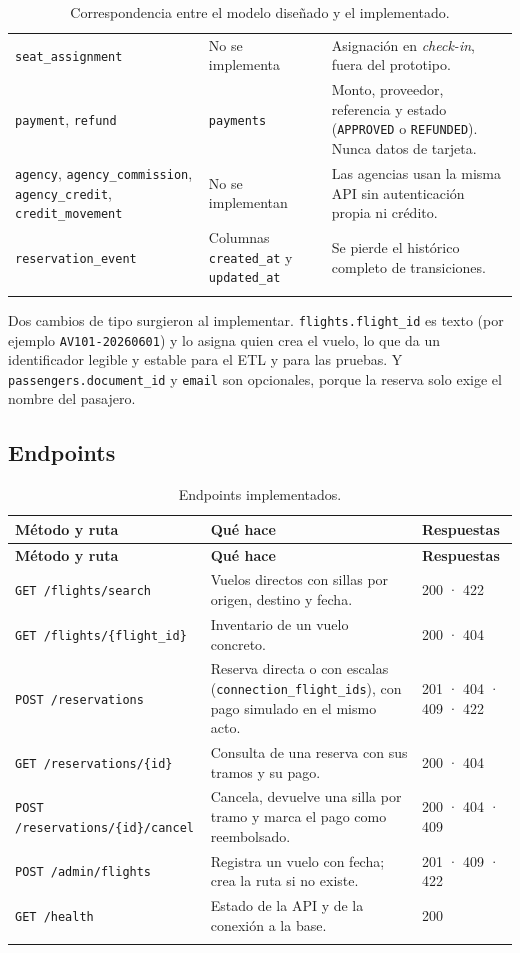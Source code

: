\begin{longtable}{@{}L{4.4cm} L{4.0cm} L{7.2cm}@{}}
\texttt{seat\_assignment} & No se implementa & Asignación en \emph{check-in}, fuera del prototipo. \\
\texttt{payment}, \texttt{refund} & \texttt{payments} & Monto, proveedor, referencia y estado (\texttt{APPROVED} o \texttt{REFUNDED}). Nunca datos de tarjeta. \\
\texttt{agency}, \texttt{agency\_commission}, \texttt{agency\_credit}, \texttt{credit\_movement} & No se implementan & Las agencias usan la misma API sin autenticación propia ni crédito. \\
\texttt{reservation\_event} & Columnas \texttt{created\_at} y \texttt{updated\_at} & Se pierde el histórico completo de transiciones. \\
\bottomrule
\caption{Correspondencia entre el modelo diseñado y el implementado.}
\end{longtable}

Dos cambios de tipo surgieron al implementar. \texttt{flights.flight\_id} es texto (por ejemplo \texttt{AV101-20260601}) y lo asigna quien crea el vuelo, lo que da un identificador legible y estable para el ETL y para las pruebas. Y \texttt{passengers.document\_id} y \texttt{email} son opcionales, porque la reserva solo exige el nombre del pasajero.

\subsection{Endpoints}
\begin{longtable}{@{}L{5.2cm} L{6.6cm} L{3.8cm}@{}}
\toprule \textbf{Método y ruta} & \textbf{Qué hace} & \textbf{Respuestas} \\ \midrule \endfirsthead
\toprule \textbf{Método y ruta} & \textbf{Qué hace} & \textbf{Respuestas} \\ \midrule \endhead
\texttt{GET /flights/search} & Vuelos directos con sillas por origen, destino y fecha. & 200 · 422 \\
\texttt{GET /flights/\{flight\_id\}} & Inventario de un vuelo concreto. & 200 · 404 \\
\texttt{POST /reservations} & Reserva directa o con escalas (\texttt{connection\_flight\_ids}), con pago simulado en el mismo acto. & 201 · 404 · 409 · 422 \\
\texttt{GET /reservations/\{id\}} & Consulta de una reserva con sus tramos y su pago. & 200 · 404 \\
\texttt{POST /reservations/\{id\}/cancel} & Cancela, devuelve una silla por tramo y marca el pago como reembolsado. & 200 · 404 · 409 \\
\texttt{POST /admin/flights} & Registra un vuelo con fecha; crea la ruta si no existe. & 201 · 409 · 422 \\
\texttt{GET /health} & Estado de la API y de la conexión a la base. & 200 \\
\bottomrule
\caption{Endpoints implementados.}
\end{longtable}

